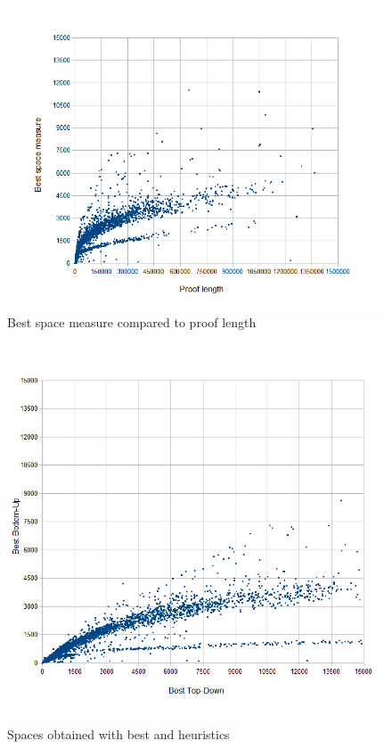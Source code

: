 \documentclass{llncs}
\begin{document}
\begin{figure}
	\centering
	\includegraphics[scale=0.4]{Figures/length_vs_space_2.png}
	\caption{Best space measure compared to proof length}
	\label{fig:SpaceVSLength}
\end{figure}

\begin{figure}
	\centering
	\includegraphics[scale=0.4]{Figures/TD_vs_BU-scatter_min.png}
	\caption{Spaces obtained with best  and  heuristics}
	\label{fig:BUvsTD}
\end{figure}
\end{document}
